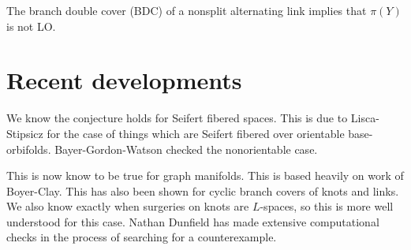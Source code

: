\documentclass{amsart}
\begin{document}
\begin{prop}
The branch double cover (BDC) of a nonsplit alternating link implies that 
$\pi\left( Y \right)$ is not LO.
\end{prop}

\section{Recent developments}

We know the conjecture holds for Seifert fibered spaces.
This is due to Lisca-Stipsicz for the case of things which are Seifert 
fibered over orientable base-orbifolds.
Bayer-Gordon-Watson checked the nonorientable case.

This is now know to be true for graph manifolds. 
This is based heavily on work of Boyer-Clay.
This has also been shown for cyclic branch covers of knots and links.
We also know exactly when surgeries on knots are $L$-spaces, so this is 
more well understood for this case.
Nathan Dunfield has made extensive computational checks in the process of 
searching for a counterexample.
\end{document}

